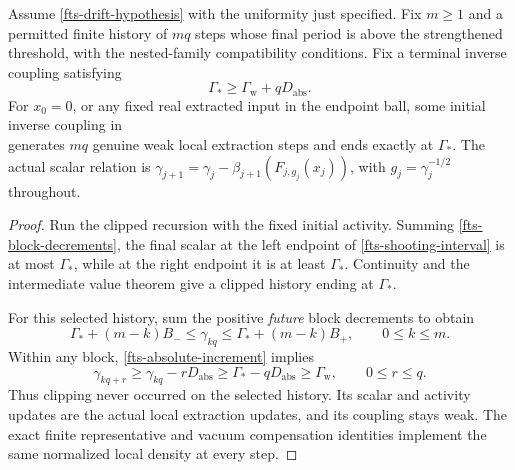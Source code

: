 \begin{theorem}
\label{fts-theorem}
Assume \eqref{fts-drift-hypothesis} with the uniformity just
specified. Fix $m\geq1$ and a permitted finite history of
$mq$ steps whose final period is above the strengthened
threshold, with the nested-family compatibility conditions.
Fix a terminal inverse coupling satisfying
\begin{equation}
       \Gamma_*\geq\Gamma_{\mathrm w}+qD_{\mathrm{abs}}.
 \label{fts-terminal-margin}
\end{equation}
For $x_0=0$, or any fixed real extracted input in the
endpoint ball, some initial inverse coupling in
\begin{equation}
       [\,\Gamma_*+mB_-,\ \Gamma_*+mB_+\,]
 \label{fts-shooting-interval}
\end{equation}
generates $mq$ genuine weak local extraction steps and
ends exactly at $\Gamma_*$. The actual scalar relation
is $\gamma_{j+1}=\gamma_j-\beta_{j+1}(F_{j,g_j}(x_j))$,
with $g_j=\gamma_j^{-1/2}$ throughout.
\end{theorem}

\begin{proof}
Run the clipped recursion with the fixed initial activity.
Summing \eqref{fts-block-decrements}, the final scalar
at the left endpoint of \eqref{fts-shooting-interval}
is at most $\Gamma_*$, while at the right endpoint it
is at least $\Gamma_*$. Continuity and the intermediate
value theorem give a clipped history ending at $\Gamma_*$.

For this selected history, sum the positive \emph{future}
block decrements to obtain
\begin{equation}
 \Gamma_*+(m-k)B_-\leq\gamma_{kq}
                   \leq\Gamma_*+(m-k)B_+,
 \qquad 0\leq k\leq m.
 \label{fts-endpoint-bounds}
\end{equation}
Within any block, \eqref{fts-absolute-increment} implies
\begin{equation}
 \gamma_{kq+r}\geq\gamma_{kq}-rD_{\mathrm{abs}}
       \geq\Gamma_*-qD_{\mathrm{abs}}
       \geq\Gamma_{\mathrm w},
 \qquad 0\leq r\leq q.
 \label{fts-no-clipping}
\end{equation}
Thus clipping never occurred on the selected history.
Its scalar and activity updates are the actual local
extraction updates, and its coupling stays weak.
The exact finite representative and vacuum compensation
identities implement the same normalized local density
at every step.
\end{proof}

